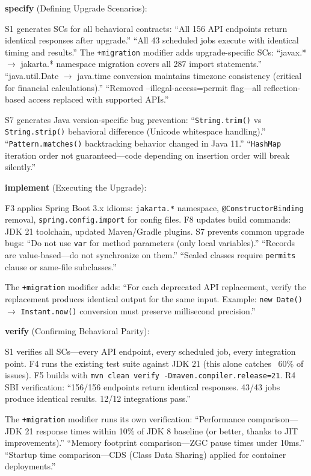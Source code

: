 \documentclass[11pt,a4paper,openright,twoside]{report}
\begin{document}
\textbf{specify} (Defining Upgrade Scenarios):

S1 generates SCs for all behavioral contracts: ``All 156 API endpoints return identical responses after upgrade.'' ``All 43 scheduled jobs execute with identical timing and results.'' The \texttt{+migration} modifier adds upgrade-specific SCs: ``javax.* $\to$ jakarta.* namespace migration covers all 287 import statements.'' ``java.util.Date $\to$ java.time conversion maintains timezone consistency (critical for financial calculations).'' ``Removed --illegal-access=permit flag---all reflection-based access replaced with supported APIs.''

S7 generates Java version-specific bug prevention: ``\texttt{String.trim()} vs \texttt{String.strip()} behavioral difference (Unicode whitespace handling).'' ``\texttt{Pattern.matches()} backtracking behavior changed in Java 11.'' ``\texttt{HashMap} iteration order not guaranteed---code depending on insertion order will break silently.''

\textbf{implement} (Executing the Upgrade):

F3 applies Spring Boot 3.x idioms: \texttt{jakarta.*} namespace, \texttt{@ConstructorBinding} removal, \texttt{spring.config.import} for config files. F8 updates build commands: JDK 21 toolchain, updated Maven/Gradle plugins. S7 prevents common upgrade bugs: ``Do not use \texttt{var} for method parameters (only local variables).'' ``Records are value-based---do not synchronize on them.'' ``Sealed classes require \texttt{permits} clause or same-file subclasses.''

The \texttt{+migration} modifier adds: ``For each deprecated API replacement, verify the replacement produces identical output for the same input. Example: \texttt{new Date()} $\to$ \texttt{Instant.now()} conversion must preserve millisecond precision.''

\textbf{verify} (Confirming Behavioral Parity):

S1 verifies all SCs---every API endpoint, every scheduled job, every integration point. F4 runs the existing test suite against JDK 21 (this alone catches ~60\% of issues). F5 builds with \texttt{mvn clean verify -Dmaven.compiler.release=21}. R4 SBI verification: ``156/156 endpoints return identical responses. 43/43 jobs produce identical results. 12/12 integrations pass.''

The \texttt{+migration} modifier runs its own verification: ``Performance comparison---JDK 21 response times within 10\% of JDK 8 baseline (or better, thanks to JIT improvements).'' ``Memory footprint comparison---ZGC pause times under 10ms.'' ``Startup time comparison---CDS (Class Data Sharing) applied for container deployments.''
\end{document}
